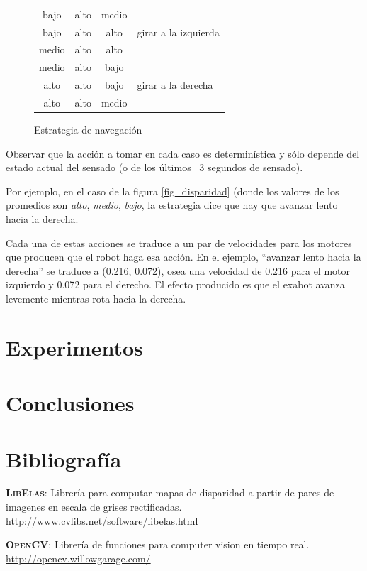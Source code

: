 \documentclass[journal,a4paper]{IEEEtran}
\newcommand{\tit}[1]{\textsc{\textbf{#1}}}
\newcommand{\alto}{{\cellcolor{red!65} alto}}
\newcommand{\medio}{{\cellcolor{red!50!blue!65} medio}}
\newcommand{\bajo}{{\cellcolor{blue!65} bajo}}
\newcommand{\multi}[2]{\multirow{#1}{*}{\parbox{3.7cm}{#2}}}
\begin{document}
\begin{figure}[h!]
\begin{tabular}{|c|c|c|p{3.7cm}|}
    \hline
    \bajo & \alto & \medio & \multi{3}{girar a la izquierda}\\
    \cline{1-3}
    \bajo & \alto & \alto & \\
    \cline{1-3}
    \medio & \alto & \alto & \\

    \hline
    \medio & \alto & \bajo & \multi{3}{girar a la derecha}\\
    \cline{1-3}
    \alto & \alto & \bajo & \\
    \cline{1-3}
    \alto & \alto & \medio & \\
    \hline
    \end{tabular}
    
    \caption{Estrategia de navegación}
    \label{tbl_estrategia}
\end{figure}

Observar que la acción a tomar en cada caso es determinística y sólo depende del estado actual del sensado (o de los últimos ~3 segundos de sensado).

Por ejemplo, en el caso de la figura \ref{fig_disparidad} (donde los valores de los promedios son \emph{alto}, \emph{medio}, \emph{bajo}, la estrategia dice que hay que avanzar lento hacia la derecha.

Cada una de estas acciones se traduce a un par de velocidades para los motores que producen que el robot haga esa acción. En el ejemplo, ``avanzar lento hacia la derecha'' se traduce a (0.216, 0.072), osea una velocidad de 0.216 para el motor izquierdo y 0.072 para el derecho. El efecto producido es que el exabot avanza levemente mientras rota hacia la derecha.

\section{Experimentos}

\section{Conclusiones}

\section{Bibliografía}

\tit{LibElas}: Librería para computar mapas de disparidad a partir de pares de imagenes en escala de grises rectificadas. \url{http://www.cvlibs.net/software/libelas.html}

\bigskip

\tit{OpenCV}: Librería de funciones para computer vision en tiempo real. \url{http://opencv.willowgarage.com/}
\end{document}
